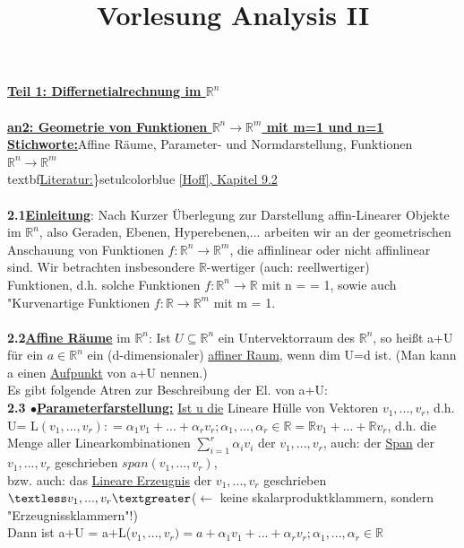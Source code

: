\documentclass[]{scrartcl}
\title{Vorlesung Analysis II}
\begin{document}
\maketitle
\textbf{\underline{Teil 1: Differnetialrechnung im $\mathbb{R}^n$}}\\
\\
\textbf{\underline{an2: Geometrie von Funktionen 
$\mathbb{R}^n\rightarrow\mathbb{R}^m$ 
mit m=1 und n=1}}\\
\textbf{\underline{Stichworte:}}Affine Räume, Parameter- und Normdarstellung, 
Funktionen 
$\mathbb{R}^n\rightarrow\mathbb{R}^m$\\
textbf{\underline{Literatur:}\}setulcolor{blue} \ul{[Hoff], Kapitel 9.2}\\
\\
\textbf{2.1}\underline{\textbf{Einleitung}}: Nach Kurzer Überlegung zur 
Darstellung 
affin-Linearer Objekte im $\mathbb{R}^n$, also Geraden, Ebenen, Hyperebenen,... 
arbeiten wir an der geometrischen Anschauung von Funktionen 
$f:\mathbb{R}^n\rightarrow\mathbb{R}^m$, die affinlinear oder nicht affinlinear 
sind. Wir betrachten insbesondere $\mathbb{R}$-wertiger (auch: reellwertiger)\\
Funktionen, d.h. solche Funktionen $f:\mathbb{R}^n\rightarrow\mathbb{R}$ mit n 
= = 1, sowie auch "Kurvenartige Funktionen $f: 
\mathbb{R}\rightarrow\mathbb{R}^m$ mit m = 1.\\\\
\textbf{2.2\underline{Affine Räume}} im $\mathbb{R}^n$: Ist 
$U\subseteq\mathbb{R}^n$ ein 
Untervektorraum des $\mathbb{R}^n$, so heißt a+U für ein $a\in \mathbb{R}^n$ 
ein (d-dimensionaler)  \ul{affiner Raum}, wenn dim U=d ist. 
(Man kann a einen \ul{Aufpunkt} von a+U nennen.)\\
Es gibt folgende Atren zur Beschreibung der El. von a+U:\\
\textbf{2.3 $\bullet$\underline{Parameterfarstellung:}} \ul{Ist u die} Lineare 
Hülle von 
Vektoren $v_1,...,v_r$, d.h. U= L$(v_1,...,v_r) : = {\alpha_1 v_1+...+\alpha_r 
v_r; \alpha_1,...,\alpha_r\in\mathbb{R}} = \mathbb{R}v_1+...+\mathbb{R}v_r$, 
d.h. die Menge aller Linearkombinationen $\sum_{i=1}^{r}\alpha_i v_i$ der 
$v_1,...,v_r$, auch: der \ul{Span} der $v_1,...,v_r$ geschrieben 
 \ul{$span(v_1,...,v_r)$},\\
bzw. auch: das  \ul{Lineare Erzeugnis} der $v_1,...,v_r$ 
geschrieben$\textless v_1,...,v_r\textgreater$($\leftarrow$ keine 
skalarproduktklammern, sondern "Erzeugnissklammern"!)\\
Dann ist a+U = a+L($v_1,...,v_r) = {a+\alpha_1 v_1 +...+ \alpha_r v_r; 
\alpha_1,...,\alpha_r\in \mathbb{R}}$\\

}
\end{document}
